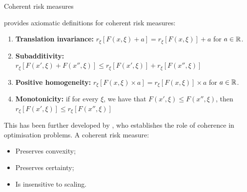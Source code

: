 \begin{frame}{Coherent risk measures}

	\alert{\cite{artzner1999coherent}} provides axiomatic definitions for coherent risk measures:
	\begin{enumerate}
		\item {\bf Translation invariance:} $r_\xi\left[F(x, \xi) + a\right] = r_\xi\left[F(x, \xi)\right] + a$ for $a \in \mathbb R$.
		\item {\bf Subadditivity:} $r_\xi\left[F(x', \xi) + F(x'', \xi)\right] \le r_\xi\left[F(x', \xi)\right] + r_\xi\left[F(x'', \xi)\right]$
		\item {\bf Positive homogeneity:	}\hspace{-6pt} $r_\xi\left[F(x, \xi) \times  a\right] = r_\xi\left[F(x, \xi)\right] \times a$ for $a \in \mathbb R$.
		\item {\bf Monotonicity: } if for every $\xi$, we have that $F(x', \xi) \le F(x'', \xi)$, then $r_\xi\left[F(x', \xi)\right] \le r_\xi\left[F(x'', \xi)\right]$
	\end{enumerate}
	
	\pause
	This has been further developed by \alert{\cite{rockafellar2007coherent}}, who establishes the role of \alert{coherence} in optimisation problems. A coherent risk measure:
		\vspace{-6pt}
		\begin{itemize}
			\item Preserves \alert{convexity};
			\item Preserves \alert{certainty};
			\item Is insensitive to \alert{scaling}.	
		\end{itemize}

\end{frame}


